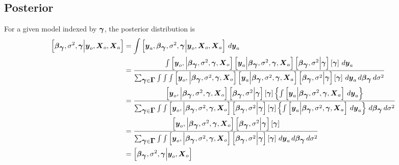 \documentclass{article}
\def\bm#1{\mbox{\boldmath $#1$}}
\begin{document}
\subsection{Posterior}
%
For a given model indexed by $\bm{\gamma}$, the posterior distribution is
%
\begin{align*}
%
\left[ \bm{\beta}_{\bm{\gamma}}, \sigma^2, \bm{\gamma} \middle| \bm{y}_o, \bm{X}_o, \bm{X}_a \right] & = \int \left[ \bm{y}_a, \bm{\beta}_{\bm{\gamma}}, \sigma^2, \bm{\gamma} \middle| \bm{y}_o, \bm{X}_o, \bm{X}_a \right] \,d \bm{y}_a\\
%
& = \frac{\int \left[ \bm{y}_o, \middle| \bm{\beta}_{\bm{\gamma}}, \sigma^2, \bm{\gamma}, \bm{X}_o \right] \left[ \bm{y}_a \middle| \bm{\beta}_{\bm{\gamma}}, \sigma^2, \bm{\gamma}, \bm{X}_a \right] \left[ \bm{\beta}_{\bm{\gamma}}, \sigma^2 \middle| \bm{\gamma} \right] \left[ \bm{\gamma} \right] \, d \bm{y}_a} {\sum_{\bm{\gamma} \in \bm{\Gamma}} \int \int \int \left[ \bm{y}_o, \middle| \bm{\beta}_{\bm{\gamma}}, \sigma^2, \bm{\gamma}, \bm{X}_o \right] \left[ \bm{y}_a \middle| \bm{\beta}_{\bm{\gamma}}, \sigma^2, \bm{\gamma}, \bm{X}_a \right] \left[ \bm{\beta}_{\bm{\gamma}}, \sigma^2 \middle| \bm{\gamma} \right] \left[ \bm{\gamma} \right] \, d \bm{y}_a \, d \bm{\beta}_{\bm{\gamma}} \, d \sigma^2} \\
%
& = \frac{ \left[ \bm{y}_o, \middle| \bm{\beta}_{\bm{\gamma}}, \sigma^2, \bm{\gamma}, \bm{X}_o \right] \left[ \bm{\beta}_{\bm{\gamma}}, \sigma^2 \middle| \bm{\gamma} \right] \left[ \bm{\gamma} \right] \left\{ \int \left[ \bm{y}_a \middle| \bm{\beta}_{\bm{\gamma}}, \sigma^2, \bm{\gamma}, \bm{X}_a \right] \, d \bm{y}_a \right\} } { \sum_{\bm{\gamma} \in \bm{\Gamma}} \int \int \left[ \bm{y}_o, \middle| \bm{\beta}_{\bm{\gamma}}, \sigma^2, \bm{\gamma}, \bm{X}_o \right] \left[ \bm{\beta}_{\bm{\gamma}}, \sigma^2 \middle| \bm{\gamma} \right] \left[ \bm{\gamma} \right] \left\{ \int  \left[ \bm{y}_a \middle| \bm{\beta}_{\bm{\gamma}}, \sigma^2, \bm{\gamma}, \bm{X}_a \right] \, d \bm{y}_a \right\} \, d \bm{\beta}_{\bm{\gamma}} \, d \sigma^2 
 } \\
%
& = \frac{ \left[ \bm{y}_o, \middle| \bm{\beta}_{\bm{\gamma}}, \sigma^2, \bm{\gamma}, \bm{X}_o \right] \left[ \bm{\beta}_{\bm{\gamma}}, \sigma^2 \middle| \bm{\gamma} \right] \left[ \bm{\gamma} \right] } { \sum_{\bm{\gamma} \in \bm{\Gamma}} \int \int \left[ \bm{y}_o, \middle| \bm{\beta}_{\bm{\gamma}}, \sigma^2, \bm{\gamma}, \bm{X}_o \right] \left[ \bm{\beta}_{\bm{\gamma}}, \sigma^2 \middle| \bm{\gamma} \right] \left[ \bm{\gamma} \right] \, d \bm{y}_a \, d \bm{\beta}_{\bm{\gamma}} \, d \sigma^2 } \\
%
 & = \left[ \bm{\beta}_{\bm{\gamma}}, \sigma^2, \bm{\gamma} \middle| \bm{y}_o, \bm{X}_o \right]
%
\end{align*}
\end{document}
